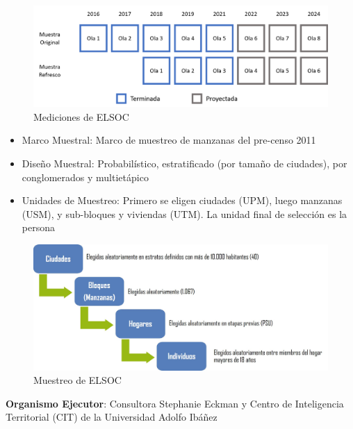 \documentclass[
  12pt,
]{book}
\begin{document}
\begin{figure}

{\centering \includegraphics[width=22.1in]{inputs/imagenes/olas_elsoc} 

}

\caption{Mediciones de ELSOC}\label{fig:ilust-olas-elsoc}
\end{figure}

\begin{itemize}
\item
  Marco Muestral: Marco de muestreo de manzanas del pre-censo 2011
\item
  Diseño Muestral: Probabilístico, estratificado (por tamaño de ciudades), por conglomerados y multietápico
\item
  Unidades de Muestreo: Primero se eligen ciudades (UPM), luego manzanas (USM), y sub-bloques y viviendas (UTM). La unidad final de selección es la persona
\end{itemize}

\begin{figure}

{\centering \includegraphics[width=25.24in]{inputs/imagenes/etapas_seleccion} 

}

\caption{Muestreo de ELSOC}\label{fig:ilust-etapas-seleccion}
\end{figure}

\textbf{Organismo Ejecutor}: Consultora Stephanie Eckman y Centro de Inteligencia Territorial (CIT) de la Universidad Adolfo Ibáñez
\end{document}
